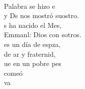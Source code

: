 \documentclass[12pt]{article}
\begin{document}
\begin{multicols*}{2}
\begin{cancion}
	\begin{chorus}%
	    \\
	 Palabra se hizo e\\
	y Ds nos mostró suostro.\\
	s ha nacido el Mes,\\
	Emmanl: Dios con sotros.\\
	es un día de espza,\\
	de ar y fraternid,\\
	ue en un pobre pes\\
	comeó   \\
	 va     \\
	\end{chorus}%
	\jump\\
\end{cancion}%


\end{multicols*}
\end{document}
